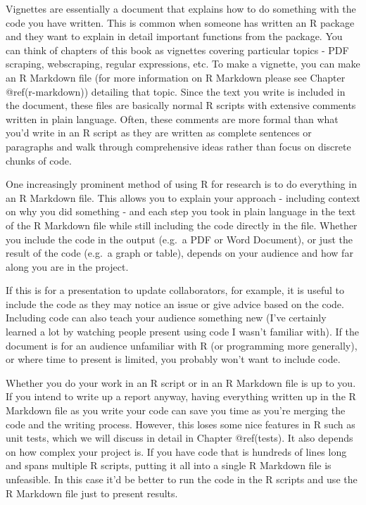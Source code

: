 \documentclass[
  a4paper,
]{krantz}
\begin{document}
Vignettes are essentially a document that explains how to do
something with the code you have written. This is common
when someone has written an R package and they want to
explain in detail important functions from the package. You
can think of chapters of this book as vignettes covering
particular topics - PDF scraping, webscraping, regular
expressions, etc. To make a vignette, you can make an R
Markdown file (for more information on R Markdown please see
Chapter @ref(r-markdown)) detailing that topic. Since the
text you write is included in the document, these files are
basically normal R scripts with extensive comments written
in plain language. Often, these comments are more formal
than what you'd write in an R script as they are written as
complete sentences or paragraphs and walk through
comprehensive ideas rather than focus on discrete chunks of
code.

One increasingly prominent method of using R for research is
to do everything in an R Markdown file. This allows you to
explain your approach - including context on why you did
something - and each step you took in plain language in the
text of the R Markdown file while still including the code
directly in the file. Whether you include the code in the
output (e.g.~a PDF or Word Document), or just the result of
the code (e.g.~a graph or table), depends on your audience
and how far along you are in the project.

If this is for a presentation to update collaborators, for
example, it is useful to include the code as they may notice
an issue or give advice based on the code. Including code
can also teach your audience something new (I've certainly
learned a lot by watching people present using code I wasn't
familiar with). If the document is for an audience
unfamiliar with R (or programming more generally), or where
time to present is limited, you probably won't want to
include code.

Whether you do your work in an R script or in an R Markdown
file is up to you. If you intend to write up a report
anyway, having everything written up in the R Markdown file
as you write your code can save you time as you're merging
the code and the writing process. However, this loses some
nice features in R such as unit tests, which we will discuss
in detail in Chapter @ref(tests). It also depends on how
complex your project is. If you have code that is hundreds
of lines long and spans multiple R scripts, putting it all
into a single R Markdown file is unfeasible. In this case
it'd be better to run the code in the R scripts and use the
R Markdown file just to present results.
\end{document}
